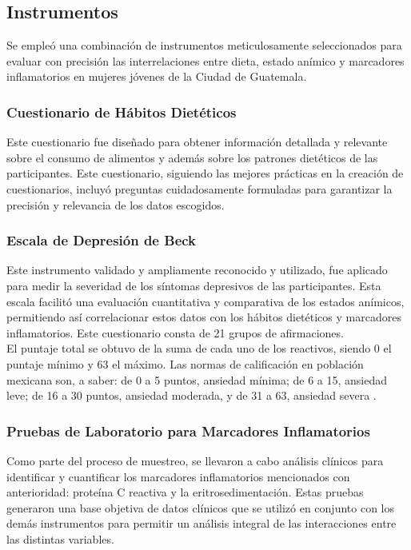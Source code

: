\documentclass[man]{apa7}
\begin{document}
	\subsection{Instrumentos}\label{instrumentos}

	Se empleó una combinación de instrumentos
	meticulosamente seleccionados para evaluar con precisión las
	interrelaciones entre dieta, estado anímico y marcadores inflamatorios
	en mujeres jóvenes de la Ciudad de Guatemala.\\

	\subsubsection{Cuestionario de Hábitos Dietéticos}
	Este cuestionario fue diseñado para obtener información detallada y relevante sobre el consumo de alimentos y además sobre los patrones dietéticos de las participantes. Este cuestionario, siguiendo las mejores prácticas en la creación de cuestionarios, incluyó preguntas cuidadosamente formuladas para garantizar la precisión y relevancia de los datos escogidos.\\

	\subsubsection{Escala de Depresión de Beck}
	Este instrumento validado y ampliamente reconocido y utilizado, fue aplicado para medir la severidad de los síntomas depresivos de las participantes. Esta escala facilitó una evaluación cuantitativa y comparativa de los estados anímicos, permitiendo así correlacionar estos datos con los hábitos dietéticos y marcadores inflamatorios. Este cuestionario consta de 21 grupos de afirmaciones.\\

	El puntaje total se obtuvo de la suma de cada uno de los reactivos, siendo 0 el puntaje mínimo y 63 el máximo. Las normas de calificación en población mexicana son, a saber: de 0 a 5 puntos, ansiedad mínima; de 6 a 15, ansiedad leve; de 16 a 30 puntos, ansiedad moderada, y de 31 a 63, ansiedad severa \parencite{beckDepressionCausesTreatment2009}.\\

	\subsubsection{Pruebas de Laboratorio para Marcadores Inflamatorios}
	Como parte del proceso de muestreo, se llevaron a cabo análisis clínicos para identificar y cuantificar los marcadores inflamatorios mencionados con anterioridad: proteína C reactiva y la eritrosedimentación. Estas pruebas generaron una base objetiva de datos clínicos que se utilizó en conjunto con los demás instrumentos para permitir un análisis integral de las interacciones entre las distintas variables.
\end{document}

